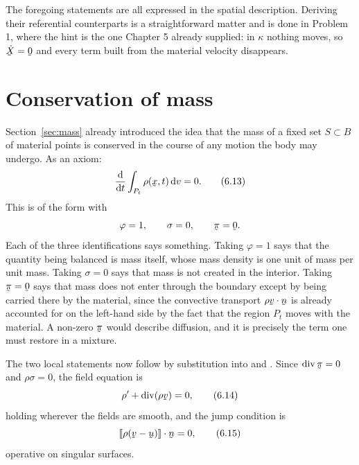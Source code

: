 The foregoing statements are all expressed in the spatial description.
Deriving their referential counterparts is a straightforward matter and
is done in Problem 1, where the hint is the one Chapter 5 already
supplied: in $\kappa$ nothing moves, so $\dot\bX=\bze$ and every term
built from the material velocity disappears.

\section{Conservation of mass}\label{sec:ch6mass}

Section~\ref{sec:mass} already introduced the idea that the mass of a
fixed set $S\subset B$ of material points is conserved in the course of
any motion the body may undergo. As an axiom:
\begin{equation}
   \frac{\dl}{\dl t}\int_{P_{t}}\rho(\bx,t)\,\dl v=0 .
   \tag{6.13}\label{eq:6.13}
\end{equation}
This is of the form  with
\[
   \varphi=1,\qquad \sigma=0,\qquad \vek\pi=\bze .
\]
Each of the three identifications says something. Taking $\varphi=1$
says that the quantity being balanced is mass itself, whose mass
density is one unit of mass per unit mass. Taking $\sigma=0$ says that
mass is not created in the interior. Taking $\vek\pi=\bze$ says that
mass does not enter through the boundary except by being carried there
by the material, since the convective transport $\rho\ip\bv\bn$ is
already accounted for on the left-hand side by the fact that the region
$P_{t}$ moves with the material. A non-zero $\vek\pi$ would describe
diffusion, and it is precisely the term one must restore in a mixture.

The two local statements now follow by substitution into  and
. Since $\dvg\vek\pi=0$ and $\rho\sigma=0$, the field
equation is
\begin{equation}
   \rho'+\dvg(\rho\bv)=0 ,
   \tag{6.14}\label{eq:6.14}
\end{equation}
holding wherever the fields are smooth, and the jump condition is
\begin{equation}
   \ip{\jump{\rho(\bv-\bu)}}\bn=0 ,
   \tag{6.15}\label{eq:6.15}
\end{equation}
operative on singular surfaces.

